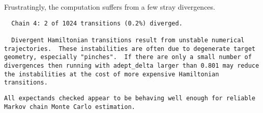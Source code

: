 \documentclass[
  letterpaper,
  DIV=11,
  numbers=noendperiod]{scrartcl}
\newenvironment{Shaded}{\begin{snugshade}}{\end{snugshade}}
\newcommand{\AttributeTok}[1]{\textcolor[rgb]{0.40,0.45,0.13}{#1}}
\newcommand{\ConstantTok}[1]{\textcolor[rgb]{0.56,0.35,0.01}{#1}}
\newcommand{\FunctionTok}[1]{\textcolor[rgb]{0.28,0.35,0.67}{#1}}
\newcommand{\NormalTok}[1]{\textcolor[rgb]{0.00,0.23,0.31}{#1}}
\newcommand{\OtherTok}[1]{\textcolor[rgb]{0.00,0.23,0.31}{#1}}
\newcommand{\SpecialCharTok}[1]{\textcolor[rgb]{0.37,0.37,0.37}{#1}}
\newcommand{\StringTok}[1]{\textcolor[rgb]{0.13,0.47,0.30}{#1}}
\begin{document}
Frustratingly, the computation suffers from a few stray divergences.

\begin{Shaded}
\end{Shaded}

\begin{verbatim}
  Chain 4: 2 of 1024 transitions (0.2%) diverged.

  Divergent Hamiltonian transitions result from unstable numerical
trajectories.  These instabilities are often due to degenerate target
geometry, especially "pinches".  If there are only a small number of
divergences then running with adept_delta larger than 0.801 may reduce
the instabilities at the cost of more expensive Hamiltonian
transitions.
\end{verbatim}

\begin{Shaded}
\end{Shaded}

\begin{verbatim}
All expectands checked appear to be behaving well enough for reliable
Markov chain Monte Carlo estimation.
\end{verbatim}
\end{document}
